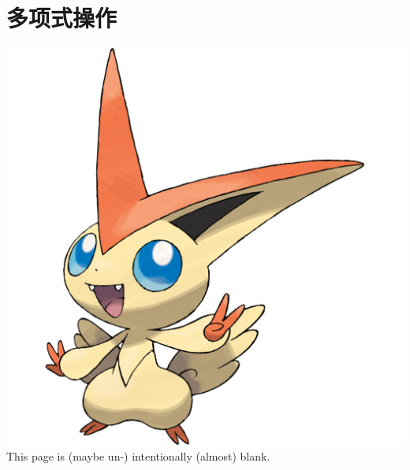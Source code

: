 \section{多项式操作}
    \noindent
    \begin{center}
        \vfill
        \vfill
        \includegraphics[scale=0.2]{pictures/Victini.png}
        \vfill
        This page is (maybe un-) intentionally (almost) blank.
        \vfill
    \end{center}
    

